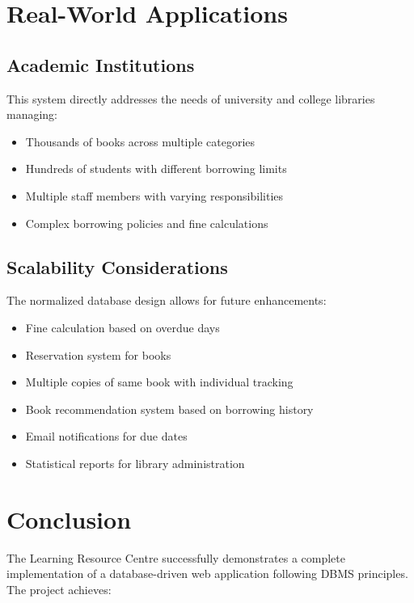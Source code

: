 \documentclass[12pt,a4paper]{article}
\begin{document}
\section{Real-World Applications}

\subsection{Academic Institutions}

This system directly addresses the needs of university and college libraries managing:
\begin{itemize}
    \item Thousands of books across multiple categories
    \item Hundreds of students with different borrowing limits
    \item Multiple staff members with varying responsibilities
    \item Complex borrowing policies and fine calculations
\end{itemize}

\subsection{Scalability Considerations}

The normalized database design allows for future enhancements:
\begin{itemize}
    \item Fine calculation based on overdue days
    \item Reservation system for books
    \item Multiple copies of same book with individual tracking
    \item Book recommendation system based on borrowing history
    \item Email notifications for due dates
    \item Statistical reports for library administration
\end{itemize}

\section{Conclusion}

The Learning Resource Centre successfully demonstrates a complete implementation of a database-driven web application following DBMS principles. The project achieves:
\end{document}
